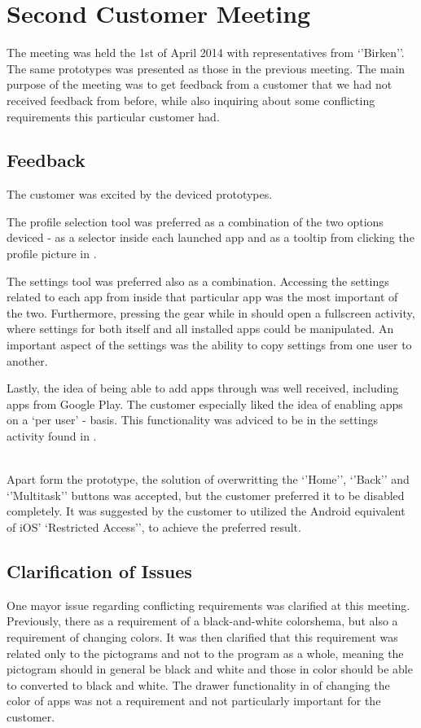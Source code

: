 \section{Second Customer Meeting}

The meeting was held the 1st of April 2014 with representatives from `'Birken''.
The same prototypes was presented as those in the previous meeting.
The main purpose of the meeting was to get feedback from a customer that we had not received feedback from before, while also inquiring about some conflicting requirements this particular customer had.

\subsection{Feedback}
The customer was excited by the deviced prototypes.

The profile selection tool was preferred as a combination of the two options deviced - as a selector inside each launched app and as a tooltip from clicking the profile picture in \launcher.

The settings tool was preferred also as a combination.
Accessing the settings related to each app from inside that particular app was the most important of the two.
Furthermore, pressing the gear while in \launcher should open a fullscreen activity, where settings for both \launcher itself and all installed apps could be manipulated.
An important aspect of the settings was the ability to copy settings from one user to another.

Lastly, the idea of being able to add apps through \launcher was well received, including apps from Google Play.
The customer especially liked the idea of enabling apps on a `per user' - basis.
This functionality was adviced to be in the settings activity found in \launcher.

\mbox{}\\
Apart form the prototype, the solution of overwritting the `'Home'', `'Back'' and `'Multitask'' buttons was accepted, but the customer preferred it to be disabled completely.
It was suggested by the customer to utilized the Android equivalent of iOS' `Restricted Access'', to achieve the preferred result.

\subsection{Clarification of Issues}
One mayor issue regarding conflicting requirements was clarified at this meeting.
Previously, there as a requirement of a black-and-white colorshema, but also a requirement of changing colors.
It was then clarified that this requirement was related only to the pictograms and not to the program as a whole, meaning the pictogram should in general be black and white and those in color should be able to converted to black and white.
The drawer functionality in \launcher of changing the color of apps was not a requirement and not particularly important for the customer.

